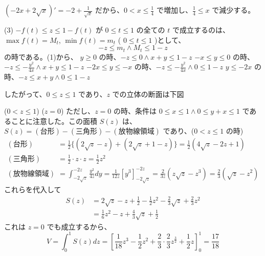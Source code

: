 \documentclass[../main.tex]{subfiles}
\begin{document}
$(-2x+2\sqrt{x})' = -2 + \frac{1}{\sqrt{x}}$ だから、$0 < x \le \frac{1}{4}$ で増加し、$\frac{1}{4} \le x$ で減少する。

(3) $-f(t) \le z \le 1-f(t)$ が $0 \le t \le 1$ の全ての $t$ で成立するのは、$\max f(t) = M_t$, $\min f(t) = m_t$ ( $0 \le t \le 1$ )として、
\[ -z \le m_t \land M_t \le 1-z \]
の時である。(1)から、
$y \ge 0$ の時、$-z \le 0 \land x+y \le 1-z$
$-x \le y \le 0$ の時、$-z \le -\frac{y^2}{4x} \land x+y \le 1-z$
$-2x \le y \le -x$ の時、$-z \le -\frac{y^2}{4x} \land 0 \le 1-z$
$y \le -2x$ の時、$-z \le x+y \land 0 \le 1-z$

したがって、$0 \le z \le 1$ であり、$z$ での立体の断面は下図
\begin{center}
\end{center}
($0 < z \le 1$) \quad ($z=0$)
ただし、$z=0$ の時、条件は $0 \le x \le 1 \land 0 \le y+x \le 1$ であることに注意した。この面積 $S(z)$ は、
$S(z) = (\text{台形}) - (\text{三角形}) - (\text{放物線領域})$
であり、($0 < z \le 1$ の時)
\begin{align*}
  (\text{台形}) &= \frac{1}{2} \{ (2\sqrt{z}-z) + (2\sqrt{z}+1-z) \} = \frac{1}{2}(4\sqrt{z}-2z+1) \\
  (\text{三角形}) &= \frac{1}{2} \cdot z \cdot z = \frac{1}{2}z^2 \\
  (\text{放物線領域}) &= \int_{-2\sqrt{z}}^{-2z} \frac{y^2}{4z} dy = \frac{1}{12z} \left[ y^3 \right]_{-2\sqrt{z}}^{-2z} = \frac{2}{3z} (z\sqrt{z}-z^3) = \frac{2}{3} (\sqrt{z}-z^2)
\end{align*}
これらを代入して
\begin{align*}
  S(z) &= 2\sqrt{z} - z + \frac{1}{2} - \frac{1}{2}z^2 - \frac{2}{3}\sqrt{z} + \frac{2}{3}z^2 \\
  &= \frac{1}{6}z^2 - z + \frac{4}{3}\sqrt{z} + \frac{1}{2}
\end{align*}
これは $z=0$ でも成立するから、
\[ V = \int_0^1 S(z) dz = \left[ \frac{1}{18}z^3 - \frac{1}{2}z^2 + \frac{2}{3} \cdot \frac{2}{3} z^{\frac{3}{2}} + \frac{1}{2}z \right]_0^1 = \frac{17}{18} \]
\end{document}
